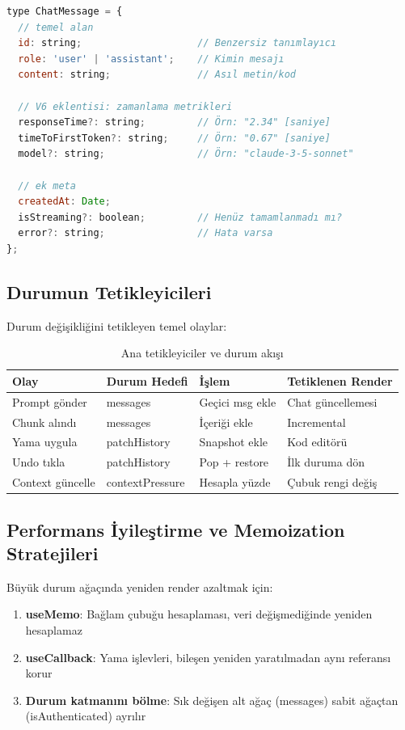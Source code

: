\documentclass[12pt,a4paper]{article}
\begin{document}
\begin{lstlisting}[language=JavaScript, caption=Genişletilmiş Chat Mesaj Türü]
type ChatMessage = {
  // temel alan
  id: string;                    // Benzersiz tanımlayıcı
  role: 'user' | 'assistant';    // Kimin mesajı
  content: string;               // Asıl metin/kod
  
  // V6 eklentisi: zamanlama metrikleri
  responseTime?: string;         // Örn: "2.34" [saniye]
  timeToFirstToken?: string;     // Örn: "0.67" [saniye]
  model?: string;                // Örn: "claude-3-5-sonnet"
  
  // ek meta
  createdAt: Date;
  isStreaming?: boolean;         // Henüz tamamlanmadı mı?
  error?: string;                // Hata varsa
};
\end{lstlisting}

\subsection{Durumun Tetikleyicileri}

Durum değişikliğini tetikleyen temel olaylar:

\begin{table}[h!]
  \centering\small
  \begin{tabular}{@{} P{2.8cm} P{2.5cm} P{3.2cm} P{3.0cm} @{}}
    \toprule
    Olay & Durum Hedefi & İşlem & Tetiklenen Render \\
    \midrule
    Prompt gönder & messages & Geçici msg ekle & Chat güncellemesi \\
    Chunk alındı & messages & İçeriği ekle & Incremental \\
    Yama uygula & patchHistory & Snapshot ekle & Kod editörü \\
    Undo tıkla & patchHistory & Pop + restore & İlk duruma dön \\
    Context güncelle & contextPressure & Hesapla yüzde & Çubuk rengi değiş \\
    \bottomrule
  \end{tabular}
  \caption{Ana tetikleyiciler ve durum akışı}
\end{table}

\subsection{Performans İyileştirme ve Memoization Stratejileri}

Büyük durum ağaçında yeniden render azaltmak için:

\begin{enumerate}[leftmargin=*]
  \item \textbf{useMemo}: Bağlam çubuğu hesaplaması, veri değişmediğinde yeniden hesaplamaz
  \item \textbf{useCallback}: Yama işlevleri, bileşen yeniden yaratılmadan aynı referansı korur
  \item \textbf{Durum katmanını bölme}: Sık değişen alt ağaç (messages) sabit ağaçtan (isAuthenticated) ayrılır
\end{enumerate}
\end{document}
